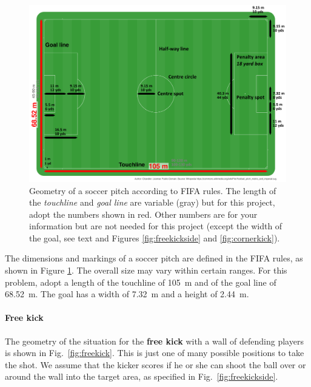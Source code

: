 \documentclass[letterpaper]{scrartcl}
\begin{document}
\begin{figure}
  \centering
  \includegraphics[width=\textwidth]{figs/Football_pitch_metric_and_imperial_edited.pdf}
  \caption{Geometry of a soccer pitch according to FIFA rules. The
    length of the \emph{touchline} and \emph{goal line} are variable
    (gray) but for this project, adopt the numbers shown in red. Other
    numbers are for your information but are not needed for this
    project (except the width of the goal, see text and Figures
    \protect\ref{fig:freekickside} and \protect\ref{fig:cornerkick}).}
  \label{fig:pitch}
\end{figure}

The dimensions and markings of a soccer pitch are defined in the FIFA
rules, as shown in Figure \ref{fig:pitch}. The
overall size may vary within certain ranges. For this problem, adopt a
length of the touchline of \SI{105}{m} and of the goal line of
\SI{68.52}{m}. The goal has a width of \SI{7.32}{m} and a height of
\SI{2.44}{m}. 


\paragraph{Free kick}

The geometry of the situation for the \textbf{free kick} with a wall
of defending players is shown in Fig.~\ref{fig:freekick}. This is just
one of many possible positions to take the shot. We assume that the
kicker scores if he or she can shoot the ball over or around the wall
into the target area, as specified in Fig.~\ref{fig:freekickside}. 
\end{document}
